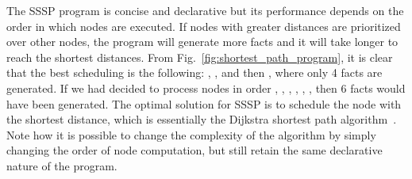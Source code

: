The SSSP program is concise and declarative but its performance depends on the
order in which nodes are executed. If nodes with greater distances are
prioritized over other nodes, the program will generate more  facts
and it will take longer to reach the shortest distances. From
Fig.~\ref{fig:shortest_path_program}, it is clear that the best scheduling is
the following: , ,  and then , where only 4
 facts are generated. If we had decided to process nodes in order
, , , , , , then 6
 facts would have been generated.  The optimal solution for SSSP is
to schedule the node with the shortest distance, which is essentially the
Dijkstra shortest path algorithm~\cite{Dijkstra}. Note how it is possible to
change the complexity of the algorithm by simply changing the order of node
computation, but still retain the same declarative nature of the program.

